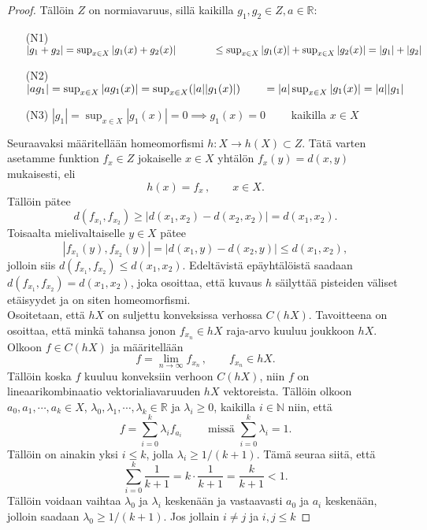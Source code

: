 \documentclass[12pt,a4paper,leqno]{report}
\newcommand{\R}{\mathbb{R}}
\newcommand{\N}{\mathbb{N}}
\theoremstyle{plain}
\theoremstyle{definition}
\theoremstyle{remark}
\begin{document}
\begin{proof}
Tällöin $Z$ on normiavaruus, sillä kaikilla $g_1,g_2\in Z, a\in \R$:
\begin{itemize}
\item[(N1)] $|g_1+g_2|=\sup_{x\in X} |g_1(x)+g_2(x)|\\
\phantom{|g_1+g_2|} \leq \sup_{x\in X} |g_1(x)|+\sup_{x\in X} |g_2(x)|=|g_1|+|g_2|$
\item[(N2)] $|ag_1|=\sup_{x\in X} |ag_1(x)|=\sup_{x\in X} (|a||g_1(x)|)\\
\phantom{|a_{1ag}} =|a|\sup_{x\in X} |g_1(x)|=|a||g_1|$
\item[(N3)] $|g_1|=\sup_{x\in X} |g_1(x)|=0\implies g_1(x)=0\qquad$ kaikilla $ x\in X$
\end{itemize}
Seuraavaksi määritellään homeomorfismi $h\colon X\rightarrow h(X)\subset Z$. Tätä varten asetamme funktion $f_x\in Z$ jokaiselle $x\in X$ yhtälön $f_x (y)=d(x,y)$ mukaisesti, eli
$$h(x)=f_x\, ,\qquad x\in X. $$ 
Tällöin pätee 
$$d(f_{x_1} ,f_{x_2} ) \geq |d(x_1 , x_2 )-d(x_2 , x_2 )|=d(x_1 ,x_2 ).$$ 
Toisaalta mielivaltaiselle $y\in X$ pätee
$$|f_{x_1} (y), f_{x_2} (y)|=|d(x_1 ,y )-d(x_2 ,y)|\leq d(x_1 , x_2 ),$$
jolloin siis $d(f_{x_1},f_{x_2})\leq d(x_1 , x_2 )$. Edeltävistä epäyhtälöistä saadaan $d(f_{x_1},f_{x_2})= d(x_1 , x_2 )$, joka osoittaa, että kuvaus $h$ säilyttää pisteiden väliset etäisyydet ja on siten homeomorfismi.\\
Osoitetaan, että $hX$ on suljettu konveksissa verhossa $C(hX)$. Tavoitteena on osoittaa, että minkä tahansa jonon $f_{x_n}\in hX$ raja-arvo kuuluu joukkoon $ hX$. Olkoon $f\in C(hX)$ ja määritellään 
$$f=\lim_{n\rightarrow\infty} f_{x_n} \, , \qquad f_{x_n}\in hX.$$ 
Tällöin koska $f$ kuuluu konveksiin verhoon $C(hX)$, niin $f$ on lineaarikombinaatio vektorialiavaruuden $hX$ vektoreista. Tällöin olkoon $a_0,a_1,\cdots, a_k \in X$, $\lambda_0,\lambda_1,\cdots, \lambda_k \in \R$ ja $\lambda_i\geq 0$, kaikilla $ i\in\N$ niin, että $$f=\sum_{i=0}^k \lambda_i f_{a_i}\qquad \text{ missä } \sum_{i=0}^k \lambda_i =1.$$
Tällöin on ainakin yksi $i\leq k$, jolla $\lambda_i \geq 1/(k+1)$. Tämä seuraa siitä, että $$\sum_{i=0}^k \frac{1}{k+1}=k\cdot \dfrac{1}{k+1}=\dfrac{k}{k+1}<1 .$$ Tällöin voidaan vaihtaa $\lambda_0$ ja $\lambda_i$ keskenään ja vastaavasti $a_0$ ja $a_i$ keskenään, jolloin saadaan $\lambda_0\geq 1/(k+1)$. Jos jollain $i\neq j$ ja $i,j\leq k$ %

\end{proof}
\end{document}
